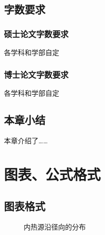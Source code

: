 \documentclass[UTF8,a4paper,12pt]{ctexart}
\numberwithin{equation}{section}
\begin{document}
\subsection{字数要求}
\subsubsection{硕士论文字数要求}
各学科和学部自定
\subsubsection{博士论文字数要求}
各学科和学部自定
\subsection{本章小结}
本章介绍了……

\newpage
\section{图表、公式格式}
\subsection{图表格式}

\begin{figure}[htb]
\caption{内热源沿径向的分布}
\end{figure}
\end{document}
